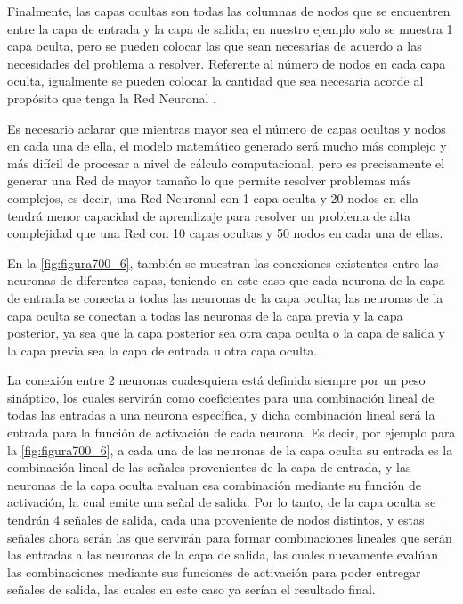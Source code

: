 {Finalmente, las capas ocultas son todas las columnas de nodos que se encuentren entre la capa de entrada y la capa de salida; en nuestro ejemplo solo se muestra 1 capa oculta, pero se pueden colocar las que sean necesarias 
de acuerdo a las necesidades del problema a resolver. Referente al número de nodos en cada capa oculta, igualmente se pueden colocar la cantidad que sea necesaria acorde al propósito que tenga la Red Neuronal \cite{AurelienGeron}. 

Es necesario aclarar que mientras mayor sea el número de capas ocultas y nodos en cada una de ella, el modelo matemático generado será mucho más complejo y más difícil de procesar a nivel de cálculo computacional, pero es 
precisamente el generar una Red de mayor tamaño lo que permite resolver problemas más complejos, es decir, una Red Neuronal con 1 capa oculta y 20 nodos en ella tendrá menor capacidad de aprendizaje
para resolver un problema de alta complejidad que una Red con 10 capas ocultas y 50 nodos en cada una de ellas.

En la \autoref{fig:figura700_6}, también se muestran las conexiones existentes entre las neuronas de diferentes capas, teniendo en este caso que cada neurona de la capa de entrada se conecta a todas las neuronas de la capa 
oculta; las neuronas de la capa oculta se conectan a todas las neuronas de la capa previa y la capa posterior, ya sea que la capa posterior sea otra capa oculta o la capa de salida y la capa previa sea la capa de entrada u 
otra capa oculta. 

La conexión entre 2 neuronas cualesquiera está definida siempre por un peso sináptico, los cuales servirán como coeficientes para una combinación lineal de todas las entradas a una neurona específica, y dicha combinación 
lineal será la entrada para la función de activación de cada neurona. Es decir, por ejemplo para la \autoref{fig:figura700_6}, a cada una de las neuronas de la capa oculta su entrada es la combinación lineal de las señales
provenientes de la capa de entrada, y las neuronas de la capa oculta evaluan esa combinación mediante su función de activación, la cual emite una señal de salida. Por lo tanto, de la capa oculta se tendrán 4 señales de 
salida, cada una proveniente de nodos distintos, y estas señales ahora serán las que servirán para formar combinaciones lineales que serán las entradas a las neuronas de la capa de salida, las cuales nuevamente evalúan las
combinaciones mediante sus funciones de activación para poder entregar señales de salida, las cuales en este caso ya serían el resultado final.

}
